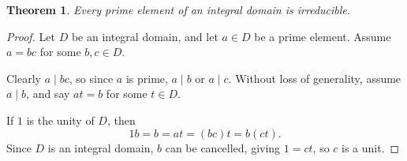 \documentclass[12pt]{article}
\newcommand{\divs}[2]{{#1}\mid{#2}}
\begin{document}
\newtheorem*{thm}{Theorem}

\begin{thm}
Every prime element of an integral domain is irreducible.
\end{thm}

\begin{proof}
Let $D$ be an integral domain, and let $a\in D$ be a prime element. Assume $a=bc$ for some $b,c\in D$.

Clearly $\divs{a}{bc}$, so since $a$ is prime, $\divs{a}{b}$ or $\divs{a}{c}$. Without loss of generality, assume $\divs{a}{b}$, and say $at=b$ for some $t\in D$.

If $1$ is the unity of $D$, then
\[
  1b=b=at=(bc)t=b(ct)
.\]
Since $D$ is an integral domain, $b$ can be cancelled, giving $1=ct$, so $c$ is a unit.
\end{proof}


\end{document}
